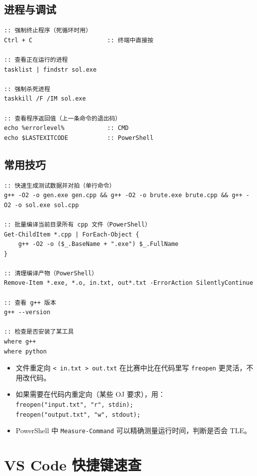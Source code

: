 \documentclass[UTF8,openany,oneside,zihao=-4]{ctexbook}
\begin{document}
\subsection{进程与调试}

\begin{lstlisting}
:: 强制终止程序（死循环时用）
Ctrl + C                     :: 终端中直接按

:: 查看正在运行的进程
tasklist | findstr sol.exe

:: 强制杀死进程
taskkill /F /IM sol.exe

:: 查看程序返回值（上一条命令的退出码）
echo %errorlevel%            :: CMD
echo $LASTEXITCODE           :: PowerShell
\end{lstlisting}

\subsection{常用技巧}

\begin{lstlisting}
:: 快速生成测试数据并对拍（单行命令）
g++ -O2 -o gen.exe gen.cpp && g++ -O2 -o brute.exe brute.cpp && g++ -O2 -o sol.exe sol.cpp

:: 批量编译当前目录所有 cpp 文件（PowerShell）
Get-ChildItem *.cpp | ForEach-Object {
    g++ -O2 -o ($_.BaseName + ".exe") $_.FullName
}

:: 清理编译产物（PowerShell）
Remove-Item *.exe, *.o, in.txt, out*.txt -ErrorAction SilentlyContinue

:: 查看 g++ 版本
g++ --version

:: 检查是否安装了某工具
where g++
where python
\end{lstlisting}

\begin{tip}
\begin{itemize}
  \item 文件重定向 \lstinline|< in.txt > out.txt| 在比赛中比在代码里写 \lstinline|freopen| 更灵活，不用改代码。
  \item 如果需要在代码内重定向（某些 OJ 要求），用：\\
    \lstinline|freopen("input.txt", "r", stdin);|\\
    \lstinline|freopen("output.txt", "w", stdout);|
  \item PowerShell 中 \lstinline|Measure-Command| 可以精确测量运行时间，判断是否会 TLE。
\end{itemize}
\end{tip}

\section{VS Code 快捷键速查}
\end{document}
